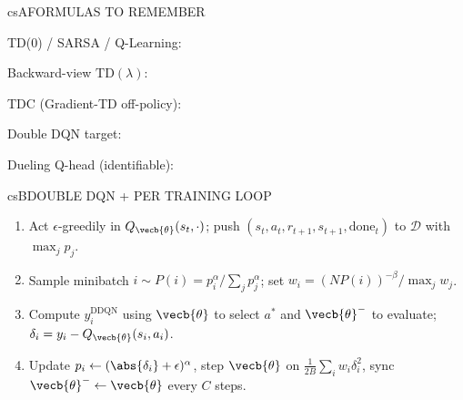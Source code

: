 \documentclass[../../../../master.tex]{subfiles}
\begin{document}
\csnextpage

\begin{cscolumns}
\begin{cscard}{csA}{FORMULAS TO REMEMBER}
  \begin{csbul}
    \item TD(0) / SARSA / Q-Learning:
    \item Backward-view $\mathrm{TD}(\lambda)$:
    \item TDC (Gradient-TD off-policy):
    \item Double DQN target:
    \item Dueling Q-head (identifiable):
  \end{csbul}
\end{cscard}

\begin{cscard}{csB}{DOUBLE DQN + PER TRAINING LOOP}
  \begin{enumerate}[leftmargin=1.2em, itemsep=1pt, topsep=1pt, parsep=0pt]
    \item Act $\epsilon$-greedily in $Q_{\vecb{\theta}}(s_t,\cdot)$; push $(s_t,a_t,r_{t+1},s_{t+1},\mathrm{done}_t)$ to $\mathcal{D}$ with $\max_j p_j$.
    \item Sample minibatch $i\sim P(i)=p_i^\alpha/\sum_j p_j^\alpha$; set $w_i=(NP(i))^{-\beta}/\max_j w_j$.
    \item Compute $y_i^{\mathrm{DDQN}}$ using $\vecb{\theta}$ to select $a^*$ and $\vecb{\theta}^-$ to evaluate; $\delta_i = y_i - Q_{\vecb{\theta}}(s_i,a_i)$.
    \item Update $p_i\gets (\abs{\delta_i}+\epsilon)^\alpha$, step $\vecb{\theta}$ on $\frac{1}{2B}\sum_i w_i\delta_i^2$, sync $\vecb{\theta}^-\gets\vecb{\theta}$ every $C$ steps.
  \end{enumerate}
\end{cscard}
\columnbreak


\end{cscolumns}
\end{document}
